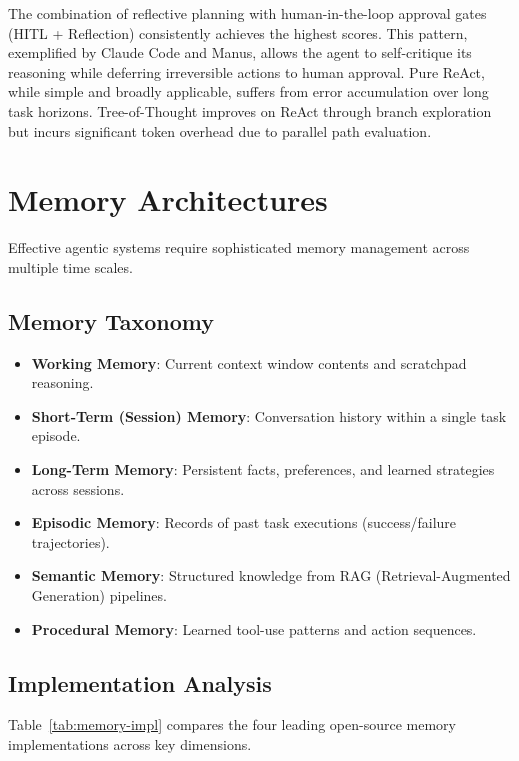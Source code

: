 \documentclass[12pt, a4paper]{article}
\begin{document}
The combination of reflective planning with human-in-the-loop approval gates (HITL + Reflection) consistently achieves the highest scores. This pattern, exemplified by Claude Code and Manus, allows the agent to self-critique its reasoning while deferring irreversible actions to human approval. Pure ReAct, while simple and broadly applicable, suffers from error accumulation over long task horizons. Tree-of-Thought improves on ReAct through branch exploration but incurs significant token overhead due to parallel path evaluation.

\section{Memory Architectures}\label{sec:memory}

Effective agentic systems require sophisticated memory management across multiple time scales.

\subsection{Memory Taxonomy}
\begin{itemize}
    \item \textbf{Working Memory}: Current context window contents and scratchpad reasoning.
    \item \textbf{Short-Term (Session) Memory}: Conversation history within a single task episode.
    \item \textbf{Long-Term Memory}: Persistent facts, preferences, and learned strategies across sessions.
    \item \textbf{Episodic Memory}: Records of past task executions (success/failure trajectories).
    \item \textbf{Semantic Memory}: Structured knowledge from RAG (Retrieval-Augmented Generation) pipelines.
    \item \textbf{Procedural Memory}: Learned tool-use patterns and action sequences.
\end{itemize}

\subsection{Implementation Analysis}
Table~\ref{tab:memory-impl} compares the four leading open-source memory implementations across key dimensions.
\end{document}
